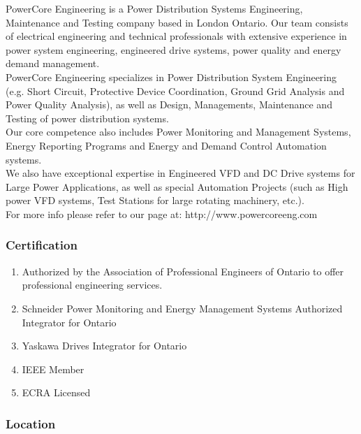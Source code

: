 \noindent PowerCore Engineering is a Power Distribution Systems Engineering, Maintenance and Testing company based in London Ontario.  Our team consists of electrical engineering and technical professionals with extensive experience in power system engineering, engineered drive systems, power quality and energy demand management.\\ 

\noindent PowerCore Engineering specializes in Power Distribution System Engineering (e.g. Short Circuit, Protective Device Coordination, Ground Grid Analysis and Power Quality Analysis), as well as Design, Managements, Maintenance and Testing of power distribution systems.  \\


Our core competence also includes Power Monitoring and Management Systems, Energy Reporting Programs and Energy and Demand Control Automation systems.  \\


We also have exceptional expertise in Engineered VFD and DC Drive systems for Large Power Applications, as well as special Automation Projects (such as High power VFD systems, Test Stations for large rotating machinery, etc.).\\

\noindent For more info please refer to our page at:  http://www.powercoreeng.com\\

\subsubsection{Certification}
\label{Sub:DOC:cert}
\begin{enumerate}
	\item Authorized by the Association of Professional Engineers of Ontario to offer professional engineering services.
	\item Schneider Power Monitoring and Energy Management Systems Authorized Integrator for Ontario
	\item Yaskawa Drives Integrator for Ontario
	\item IEEE Member
	\item ECRA Licensed
\end{enumerate}

\subsubsection{Location}
\label{Sub:DOC:loc}

